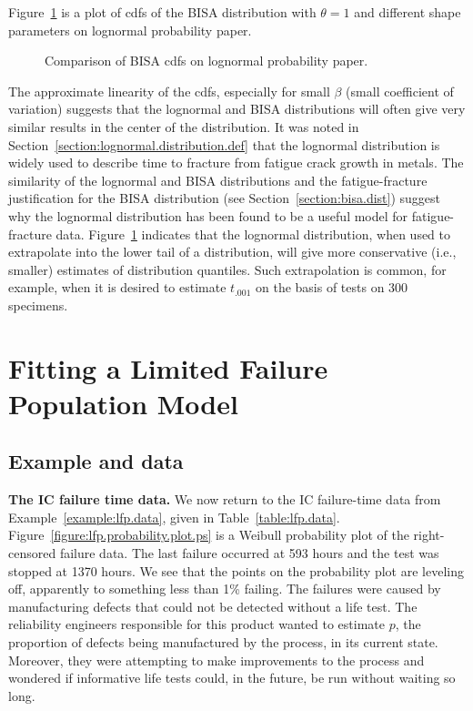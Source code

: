 Figure~\ref{figure:bisa.ln.cf.ps} is a plot of cdfs of the BISA
distribution with $\theta=1$ and different shape parameters on lognormal 
probability paper.
\begin{figure}
\caption{Comparison of BISA cdfs on lognormal probability paper.}
\label{figure:bisa.ln.cf.ps}
\end{figure}
The approximate linearity of the cdfs, especially for small $\beta$
(small coefficient of variation) suggests that the lognormal and
BISA distributions will often give very similar results in the
center of the distribution.  It was noted in
Section~\ref{section:lognormal.distribution.def} that the lognormal
distribution is widely used to describe time to fracture from
fatigue crack growth in metals.  The similarity of the lognormal and
BISA distributions and the fatigue-fracture justification for the
BISA distribution (see Section~\ref{section:bisa.dist}) suggest why
the lognormal distribution has been found to be a useful model for
fatigue-fracture data.  Figure~\ref{figure:bisa.ln.cf.ps} indicates
that the lognormal distribution, when used to extrapolate into the
lower tail of a distribution, will give more conservative (i.e.,
smaller) estimates of distribution quantiles. Such extrapolation is
common, for example, when it is desired to estimate $t_{.001}$ on
the basis of tests on 300 specimens.

\section{Fitting a Limited Failure Population Model}
\label{section:using.the.lfp.model}

\subsection{Example and data}
\begin{example}
\label{example:lfp.ic.data}
{\bf The IC failure time data.}
We now return to the IC failure-time data 
from Example~\ref{example:lfp.data}, given in Table~\ref{table:lfp.data}.
Figure~\ref{figure:lfp.probability.plot.ps} is a Weibull probability
plot of the right-censored failure data. The last failure occurred at
593 hours and the test was stopped at 1370 hours.  We see that the
points on the probability plot are leveling off, apparently to
something less than 1\% failing.  The failures were caused by
manufacturing defects that could not be detected without a life test.
The reliability engineers responsible for this product wanted to
estimate $p$, the proportion of defects being manufactured by the
process, in its current state. Moreover, they were attempting to
make improvements to the process and wondered if informative life tests
could, in the future, be run without waiting so long.
\end{example}


